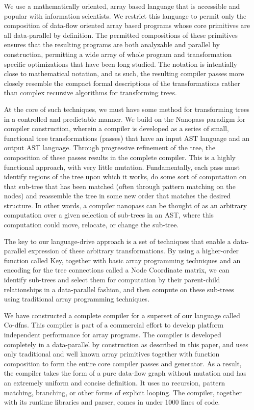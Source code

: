 \documentclass[numbers,preprint]{sigplanconf}
\begin{document}
We use a mathematically oriented, array based language that is
accessible and popular with information scientists. We restrict
this language to permit only the composition of data-flow oriented
array based programs whose core primitives are all data-parallel by
definition. The permitted compositions of these primitives ensures
that the resulting programs are both analyzable and parallel
by construction, permitting a wide array of whole program and
transformation specific optimizations that have been long studied.
The notation is intentially close to mathematical notation, and
as such, the resulting compiler passes more closely resemble the
compact formal descriptions of the transformations rather than complex
recursive algorithms for transforming trees.

At the core of such techniques, we must have some method for
transforming trees in a controlled and predictable manner. We
build on the Nanopass paradigm for compiler construction, wherein
a compiler is developed as a series of small, functional tree
transformations (passes) that have an input AST language and an
output AST language. Through progressive refinement of the tree, the
composition of these passes results in the complete compiler. This is a
highly functional approach, with very little mutation.  Fundamentally,
each pass must identify regions of the tree upon which it works,
do some sort of computation on that sub-tree that has been matched
(often through pattern matching on the nodes) and reassemble the tree
in some new order that matches the desired structure. In other words,
a compiler nanopass can be thought of as an arbitrary computation
over a given selection of sub-trees in an AST, where this computation
could move, relocate, or change the sub-tree.

The key to our language-drive approach is a set of techniques
that enable a data-parallel expression of these arbitrary
transformations. By using a higher-order function called Key, together
with basic array programming techniques and an encoding for the tree
connections called a Node Coordinate matrix, we can identify sub-trees
and select them for computation by their parent-child relationships
in a data-parallel fashion, and then compute on these sub-trees using
traditional array programming techniques.

We have constructed a complete compiler for a superset of our language
called Co-dfns. This compiler is part of a commercial effort to develop
platform independent performance for array programs. The compiler is
developed completely in a data-parallel by construction as described in
this paper, and uses only traditional and well known array primitives
together with function composition to form the entire core compiler
passes and generator. As a result, the compiler takes the form of a
pure data-flow graph without mutation and has an extremely uniform and
concise definition. It uses no recursion, pattern matching, branching,
or other forms of explicit looping. The compiler, together with its
runtime libraries and parser, comes in under 1000 lines of code.
\end{document}
